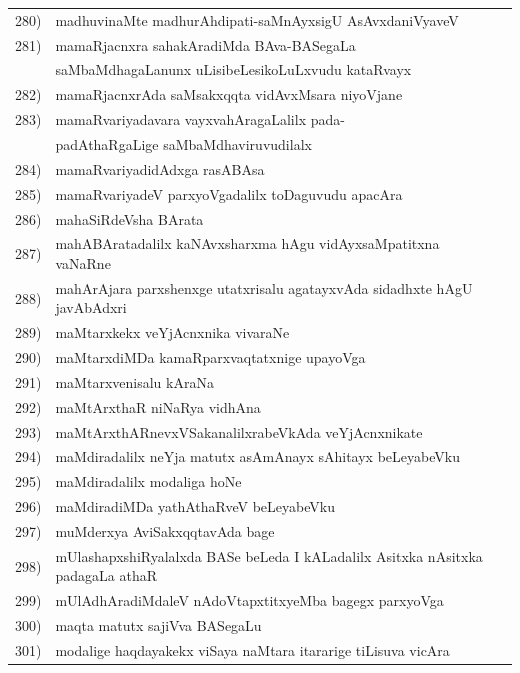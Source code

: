 \begin{longtable}{@{}cp{7.4cm}r}
280) & madhuvinaMte madhurAhdipati-saMnAyxsigU AsAvxdaniVyaveV & \pageref{page238}\\
281) & mamaRjacnxra sahakAradiMda BAva-BASegaLa &  \\
     & saMbaMdhagaLanunx uLisibeLesikoLuLxvudu kataRvayx & \pageref{page18}\\ 
282) & mamaRjacnxrAda saMsakxqqta vidAvxMsara niyoVjane & \pageref{page32}\\
283) & mamaRvariyadavara vayxvahAragaLalilx pada- & \\
     & padAthaRgaLige saMbaMdhaviruvudilalx & \pageref{page205a}\\
284) & mamaRvariyadidAdxga rasABAsa & \pageref{page229b}\\
285) & mamaRvariyadeV parxyoVgadalilx toDaguvudu apacAra & \pageref{page209}\\
286) & mahaSiRdeVsha BArata & \pageref{page103a}\\
287) & mahABAratadalilx kaNAvxsharxma hAgu vidAyxsaMpatitxna vaNaRne & \pageref{page57}\\
288) & mahArAjara parxshenxge utatxrisalu agatayxvAda sidadhxte hAgU javAbAdxri & \pageref{page131b}\\
289) & maMtarxkekx veYjAcnxnika vivaraNe & \pageref{page115a}\\ 
290) & maMtarxdiMDa kamaRparxvaqtatxnige upayoVga & \pageref{page117}\\
291) & maMtarxvenisalu kAraNa & \pageref{page120b}\\
292) & maMtArxthaR niNaRya vidhAna & \pageref{page118a}\\
293) & maMtArxthARnevxVSakanalilxrabeVkAda veYjAcnxnikate  & \pageref{page119}\\
294) & maMdiradalilx neYja matutx asAmAnayx sAhitayx beLeyabeVku & \pageref{page78}\\ 
295) & maMdiradalilx modaliga hoNe & \pageref{page70a}\\
296) & maMdiradiMDa yathAthaRveV beLeyabeVku & \pageref{page69}\\
297) & muMderxya AviSakxqqtavAda bage & \pageref{page73}\\
298) & mUlashapxshiRyalalxda BASe beLeda I kALadalilx Asitxka nAsitxka padagaLa athaR & \pageref{page189}\\
299) & mUlAdhAradiMdaleV nAdoVtapxtitxyeMba bagegx parxyoVga & \pageref{page171}\\
300) &maqta matutx sajiVva BASegaLu & \pageref{page109b}\\
301) & modalige haqdayakekx viSaya naMtara itararige tiLisuva vicAra & \pageref{page131}\\

\end{longtable}
